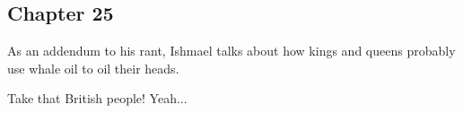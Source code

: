 \subsection{Chapter 25}

As an addendum to his rant, Ishmael talks about how kings and queens probably
use whale oil to oil their heads.

Take that British people! Yeah...
